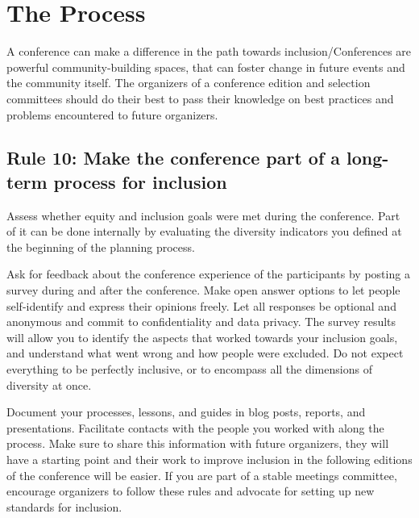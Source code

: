 \documentclass[10pt,letterpaper]{article}
\begin{document}
\section*{The Process}

A conference can make a difference in the path towards inclusion/Conferences are powerful community-building spaces, that can foster change in future events and the community itself. The organizers of a conference edition and selection committees should do their best to pass their knowledge on best practices and problems encountered to future organizers.


\subsection*{Rule 10: Make the conference part of a long-term process for inclusion}
\label{rule_process}

Assess whether equity and inclusion goals were met during the conference. 
Part of it can be done internally by evaluating the diversity indicators you defined at the beginning of the planning process. %
 
Ask for feedback about the conference experience of the participants by posting a survey during and after the conference. 
Make open answer options to let people self-identify and express their opinions freely. Let all responses be optional and anonymous and commit to confidentiality and data privacy. 
The survey results will allow you to identify the aspects that worked towards your inclusion goals, and understand what went wrong and how people were excluded.
Do not expect everything to be perfectly inclusive, or to encompass all the dimensions of diversity at once. %

Document your processes, lessons, and guides in blog posts, reports, and presentations. 
Facilitate contacts with the people you worked with along the process. 
Make sure to share this information with future organizers,
they will have a starting point and their work to improve inclusion in the following editions of the conference will be easier.
If you are part of a stable meetings committee, encourage organizers to follow these rules and advocate for setting up new standards for inclusion. 
\end{document}

